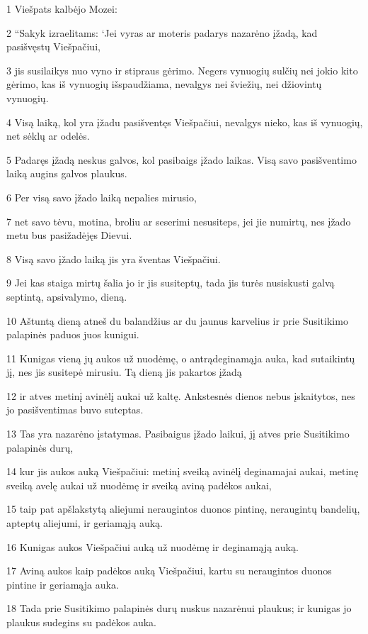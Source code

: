 \par 1 Viešpats kalbėjo Mozei: 
\par 2 “Sakyk izraelitams: ‘Jei vyras ar moteris padarys nazarėno įžadą, kad pasišvęstų Viešpačiui, 
\par 3 jis susilaikys nuo vyno ir stipraus gėrimo. Negers vynuogių sulčių nei jokio kito gėrimo, kas iš vynuogių išspaudžiama, nevalgys nei šviežių, nei džiovintų vynuogių. 
\par 4 Visą laiką, kol yra įžadu pasišventęs Viešpačiui, nevalgys nieko, kas iš vynuogių, net sėklų ar odelės. 
\par 5 Padaręs įžadą neskus galvos, kol pasibaigs įžado laikas. Visą savo pasišventimo laiką augins galvos plaukus. 
\par 6 Per visą savo įžado laiką nepalies mirusio, 
\par 7 net savo tėvu, motina, broliu ar seserimi nesusiteps, jei jie numirtų, nes įžado metu bus pasižadėjęs Dievui. 
\par 8 Visą savo įžado laiką jis yra šventas Viešpačiui. 
\par 9 Jei kas staiga mirtų šalia jo ir jis susiteptų, tada jis turės nusiskusti galvą septintą, apsivalymo, dieną. 
\par 10 Aštuntą dieną atneš du balandžius ar du jaunus karvelius ir prie Susitikimo palapinės paduos juos kunigui. 
\par 11 Kunigas vieną jų aukos už nuodėmę, o antrą­deginamąja auka, kad sutaikintų jį, nes jis susitepė mirusiu. Tą dieną jis pakartos įžadą 
\par 12 ir atves metinį avinėlį aukai už kaltę. Ankstesnės dienos nebus įskaitytos, nes jo pasišventimas buvo suteptas. 
\par 13 Tas yra nazarėno įstatymas. Pasibaigus įžado laikui, jį atves prie Susitikimo palapinės durų, 
\par 14 kur jis aukos auką Viešpačiui: metinį sveiką avinėlį deginamajai aukai, metinę sveiką avelę aukai už nuodėmę ir sveiką aviną padėkos aukai, 
\par 15 taip pat apšlakstytą aliejumi neraugintos duonos pintinę, neraugintų bandelių, apteptų aliejumi, ir geriamąją auką. 
\par 16 Kunigas aukos Viešpačiui auką už nuodėmę ir deginamąją auką. 
\par 17 Aviną aukos kaip padėkos auką Viešpačiui, kartu su neraugintos duonos pintine ir geriamąja auka. 
\par 18 Tada prie Susitikimo palapinės durų nuskus nazarėnui plaukus; ir kunigas jo plaukus sudegins su padėkos auka. 

